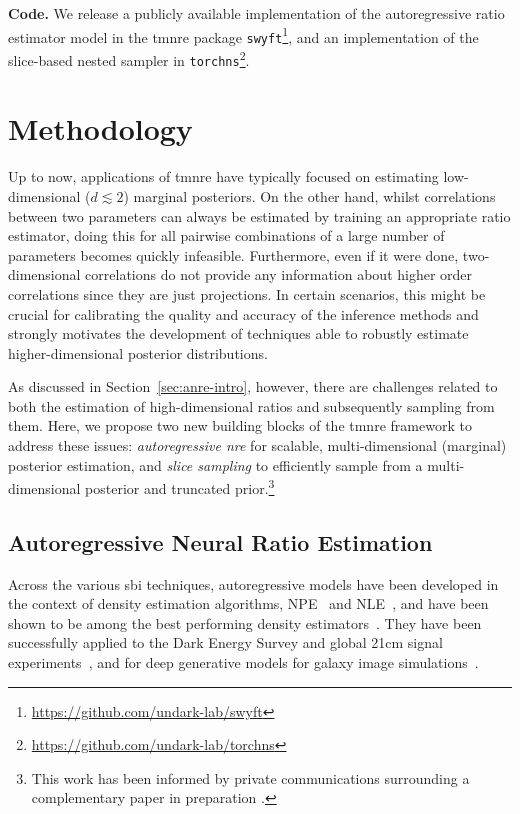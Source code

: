 \vspace{10pt}
 \textbf{Code.} We release a publicly available implementation of the autoregressive ratio estimator model in the \gls*{tmnre} package \texttt{swyft}\footnote{\url{https://github.com/undark-lab/swyft}}, and an implementation of the slice-based nested sampler in \texttt{torchns}\footnote{\url{https://github.com/undark-lab/torchns}}.


\section{Methodology} \label{sec:anre-method}

 Up to now, applications of \gls*{tmnre} have typically focused on estimating low-dimensional ($d \lesssim 2$) marginal posteriors. On the other hand, whilst correlations between two parameters can always be estimated by training an appropriate ratio estimator, doing this for all pairwise combinations of a large number of parameters becomes quickly infeasible. Furthermore, even if it were done, two-dimensional correlations do not provide any information about higher order correlations since they are just projections. In certain scenarios, this might be crucial for calibrating the quality and accuracy of the inference methods and strongly motivates the development of techniques able to robustly estimate higher-dimensional posterior distributions.

As discussed in Section~\ref{sec:anre-intro}, however, there are challenges related to both the estimation of high-dimensional ratios and subsequently sampling from them. Here, we propose two new building blocks of the \gls*{tmnre} framework to address these issues: \emph{autoregressive \gls*{nre}} for scalable, multi-dimensional (marginal) posterior estimation, and \emph{slice sampling} to efficiently sample from a multi-dimensional posterior and truncated prior.\footnote{This work has been informed by private communications surrounding a complementary paper in preparation \cite{PolySwyft}.}

\subsection{Autoregressive Neural Ratio Estimation} \label{subsec:anre-anre}

 Across the various \gls*{sbi} techniques, autoregressive models have been developed in the context of density estimation algorithms, NPE~\cite{Uria:2016aa, Papamakarios:2017tec} and NLE~\cite{Papamakarios:2018aa}, and have been shown to be among the best performing density estimators~\cite{Lueckmann:2021aa}. They have been successfully applied to the Dark Energy Survey and global 21cm signal experiments~\cite{Bevins:2022qsc}, and for deep generative models for galaxy image simulations~\cite{Lanusse:2020aa}.

